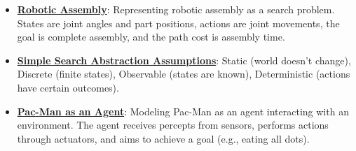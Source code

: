 \documentclass{article}%
\begin{document}
\begin{itemize}[leftmargin=*]
\item \href{https://purdue.brightspace.com/d2l/common/assets/pdfjs-d2l-dist/1.0.14-legacy/web/viewer.html?file=\%2Fcontent\%2Fenforced\%2F1095467-wl.202510.CS.24300.001\%2F14L1-DepthFS.pdf\%3Fou\%3D1095467\&lang=en-us\&container=d2l-fileviewer-rendered-pdf\&fullscreen=d2l-fileviewer-rendered-pdf-dialog\&height=667#page=33}{\textbf{Robotic Assembly}}: Representing robotic assembly as a search problem. States are joint angles and part positions, actions are joint movements, the goal is complete assembly, and the path cost is assembly time.%
\item \href{https://purdue.brightspace.com/d2l/common/assets/pdfjs-d2l-dist/1.0.14-legacy/web/viewer.html?file=\%2Fcontent\%2Fenforced\%2F1095467-wl.202510.CS.24300.001\%2F14L1-DepthFS.pdf\%3Fou\%3D1095467\&lang=en-us\&container=d2l-fileviewer-rendered-pdf\&fullscreen=d2l-fileviewer-rendered-pdf-dialog\&height=667#page=34}{\textbf{Simple Search Abstraction Assumptions}}: Static (world doesn't change), Discrete (finite states), Observable (states are known), Deterministic (actions have certain outcomes).%
\item \href{https://purdue.brightspace.com/d2l/common/assets/pdfjs-d2l-dist/1.0.14-legacy/web/viewer.html?file=\%2Fcontent\%2Fenforced\%2F1095467-wl.202510.CS.24300.001\%2F14L1-DepthFS.pdf\%3Fou\%3D1095467\&lang=en-us\&container=d2l-fileviewer-rendered-pdf\&fullscreen=d2l-fileviewer-rendered-pdf-dialog\&height=667#page=35}{\textbf{Pac{-}Man as an Agent}}: Modeling Pac-Man as an agent interacting with an environment. The agent receives percepts from sensors, performs actions through actuators, and aims to achieve a goal (e.g., eating all dots).%
\end{itemize}%
\end{document}
